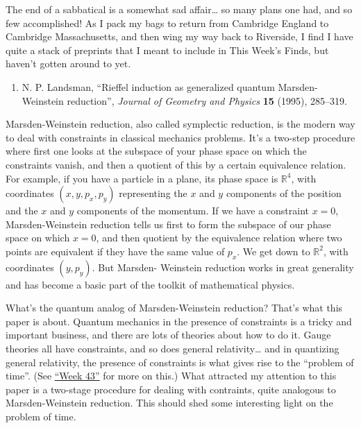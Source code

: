 \documentclass{article}
\def\tightlist{}
\begin{document}
The end of a sabbatical is a somewhat sad affair\ldots{} so many plans
one had, and so few accomplished! As I pack my bags to return from
Cambridge England to Cambridge Massachusetts, and then wing my way back
to Riverside, I find I have quite a stack of preprints that I meant to
include in This Week's Finds, but haven't gotten around to yet.

\begin{enumerate}
\def\labelenumi{\arabic{enumi})}
\tightlist
\item
  N. P. Landsman, ``Rieffel induction as generalized quantum
  Marsden-Weinstein reduction'', \emph{Journal of Geometry and Physics}
  \textbf{15} (1995), 285--319.
\end{enumerate}

Marsden-Weinstein reduction, also called symplectic reduction, is the
modern way to deal with constraints in classical mechanics problems.
It's a two-step procedure where first one looks at the subspace of your
phase space on which the constraints vanish, and then a quotient of this
by a certain equivalence relation. For example, if you have a particle
in a plane, its phase space is \(\mathbb{R}^4\), with coordinates
\((x,y,p_x,p_y)\) representing the \(x\) and \(y\) components of the
position and the \(x\) and \(y\) components of the momentum. If we have
a constraint \(x = 0\), Marsden-Weinstein reduction tells us first to
form the subspace of our phase space on which \(x = 0\), and then
quotient by the equivalence relation where two points are equivalent if
they have the same value of \(p_x\). We get down to \(\mathbb{R}^2\),
with coordinates \((y,p_y)\). But Marsden- Weinstein reduction works in
great generality and has become a basic part of the toolkit of
mathematical physics.

What's the quantum analog of Marsden-Weinstein reduction? That's what
this paper is about. Quantum mechanics in the presence of constraints is
a tricky and important business, and there are lots of theories about
how to do it. Gauge theories all have constraints, and so does general
relativity\ldots{} and in quantizing general relativity, the presence of
constraints is what gives rise to the ``problem of time''. (See
\protect\hyperlink{week43}{``Week 43''} for more on this.) What
attracted my attention to this paper is a two-stage procedure for
dealing with contraints, quite analogous to Marsden-Weinstein reduction.
This should shed some interesting light on the problem of time.
\end{document}

